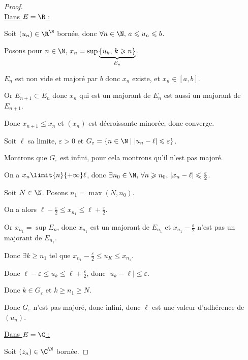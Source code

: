 \begin{proof}~\\
    \uline{Dans $E = \R$ :}

    Soit $(u_n) \in \R^{\N}$ bornée, donc $\forall n \in \N, \, a \leqslant u_n \leqslant b$. 

    Posons pour $n \in \N, \, x_n = \sup \underbrace{\{u_k, \, k \geqslant n\}}_{E_n}$.

    $E_n$ est non vide et majoré par $b$ donc $x_n$ existe, et $x_n \in [a, b]$.

    Or $E_{n + 1} \subset E_n$ donc $x_n$ qui est un majorant de $E_n$ est aussi un majorant de $E_{n + 1}$.

    Donc $x_{n + 1} \leqslant x_n$ et $(x_n)$ est décroissante minorée, donc converge. 

    Soit $\ell$ sa limite, $\varepsilon > 0$ et $G_\varepsilon = \{n \in \N \mid |u_n - \ell| \leqslant \varepsilon\}$.

    Montrons que $G_\varepsilon$ est infini, pour cela montrons qu'il n'est pas majoré.

    On a $x_n \limit{n}{+\infty} \ell$, donc $\exists n_0 \in \N, \, \forall n \geqslant n_0, \, |x_n - \ell| \leqslant \frac \varepsilon 2$.

    Soit $N \in \N$.
    Posons $n_1 = \max(N, n_0)$.

    On a alors $\ell - \frac \varepsilon 2 \leqslant x_{n_1} \leqslant \ell + \frac \varepsilon 2$.

    Or $x_{n_1} = \sup E_n$, donc $x_{n_1} $ est un majorant de $E_{n_1}$ et 
    $x_{n_1} - \frac \varepsilon 2$ n'est pas un majorant de $E_{n_1}$.

    Donc $\exists k \geqslant n_1$ tel que $x_{n_1} - \frac \varepsilon 2 \leqslant u_K \leqslant x_{n_1}$.
    
    Donc $\ell - \varepsilon \leqslant u_k \leqslant \ell + \frac \varepsilon 2$,
    donc $| u_k - \ell| \leqslant \varepsilon$. 

    Donc $k \in G_\varepsilon$ et $k \geqslant n_1 \geqslant N$.

    Donc $G_\varepsilon$ n'est pas majoré, donc infini, donc $\ell$ est une valeur d'adhérence de $(u_n)$. \\

    
    \uline{Dans $E = \C$ :}

    Soit $(z_n) \in \C^{\N}$ bornée. 


\end{proof}
